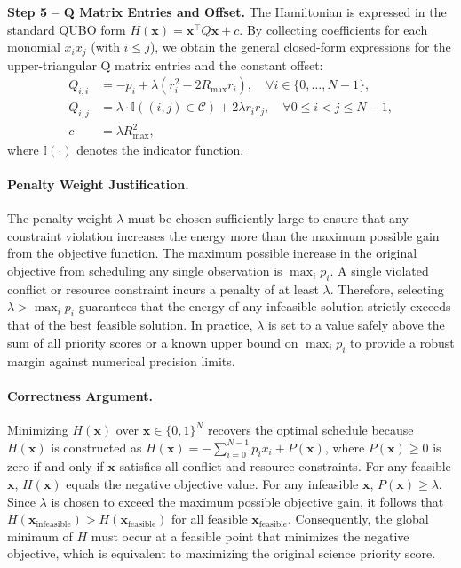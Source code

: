 \documentclass[12pt]{article}
\begin{document}
\textbf{Step 5 -- Q Matrix Entries and Offset.} The Hamiltonian is expressed in the standard QUBO form $H(\mathbf{x}) = \mathbf{x}^\top Q \mathbf{x} + c$. By collecting coefficients for each monomial $x_i x_j$ (with $i \leq j$), we obtain the general closed-form expressions for the upper-triangular Q matrix entries and the constant offset:
\begin{align}
    Q_{i,i} &= -p_i + \lambda (r_i^2 - 2 R_{\max} r_i), \quad \forall i \in \{0, \dots, N-1\}, \\
    Q_{i,j} &= \lambda \cdot \mathbb{I}((i,j) \in \mathcal{C}) + 2\lambda r_i r_j, \quad \forall 0 \leq i < j \leq N-1, \\
    c &= \lambda R_{\max}^2,
\end{align}
where $\mathbb{I}(\cdot)$ denotes the indicator function.

\paragraph{Penalty Weight Justification.}
The penalty weight $\lambda$ must be chosen sufficiently large to ensure that any constraint violation increases the energy more than the maximum possible gain from the objective function. The maximum possible increase in the original objective from scheduling any single observation is $\max_{i} p_i$. A single violated conflict or resource constraint incurs a penalty of at least $\lambda$. Therefore, selecting $\lambda > \max_{i} p_i$ guarantees that the energy of any infeasible solution strictly exceeds that of the best feasible solution. In practice, $\lambda$ is set to a value safely above the sum of all priority scores or a known upper bound on $\max_{i} p_i$ to provide a robust margin against numerical precision limits.

\paragraph{Correctness Argument.}
Minimizing $H(\mathbf{x})$ over $\mathbf{x} \in \{0,1\}^N$ recovers the optimal schedule because $H(\mathbf{x})$ is constructed as $H(\mathbf{x}) = -\sum_{i=0}^{N-1} p_i x_i + P(\mathbf{x})$, where $P(\mathbf{x}) \geq 0$ is zero if and only if $\mathbf{x}$ satisfies all conflict and resource constraints. For any feasible $\mathbf{x}$, $H(\mathbf{x})$ equals the negative objective value. For any infeasible $\mathbf{x}$, $P(\mathbf{x}) \geq \lambda$. Since $\lambda$ is chosen to exceed the maximum possible objective gain, it follows that $H(\mathbf{x}_{\text{infeasible}}) > H(\mathbf{x}_{\text{feasible}})$ for all feasible $\mathbf{x}_{\text{feasible}}$. Consequently, the global minimum of $H$ must occur at a feasible point that minimizes the negative objective, which is equivalent to maximizing the original science priority score.
\end{document}
